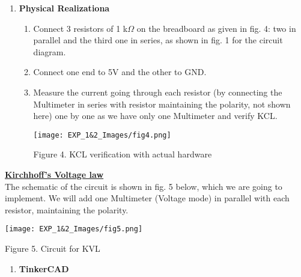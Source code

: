 \documentclass[12pt,a4paper]{article}
\begin{document}
\begin{justify}
\begin{enumerate}
\begin{center} 
\texttt{[image: EXP\_1\&2\_Images/fig3.png]}
\end{center}
\vspace{-10mm}
\begin{center} {Figure 3. KCL verification on TinkerCAD}\end{center}


\item{\textbf{Physical Realizationa}}

    \begin{enumerate}
    \item Connect 3 resistors of 1 k$\Omega$ on the breadboard as given in fig. 4: two in parallel and the third one in series, as shown in fig. 1 for the circuit diagram.
    \item Connect one end to 5V and the other to GND.
    \item Measure the current going through each resistor (by connecting the Multimeter in series with resistor maintaining the polarity, not shown here) one by one as we have only one Multimeter and verify KCL.
    
    \begin{center} 
    \texttt{[image: EXP\_1\&2\_Images/fig4.png]}
    \end{center}
    \begin{center} {Figure 4. KCL verification with actual hardware}\end{center}
    \end{enumerate}
    
\end {enumerate}

\noindent \underline{\textbf{Kirchhoff's Voltage law }}\\[3pt]
The schematic of the circuit is shown in fig. 5 below, which we are going to implement. We will add one Multimeter (Voltage mode) in parallel with each resistor, maintaining the polarity.

    \begin{center} 
    \texttt{[image: EXP\_1\&2\_Images/fig5.png]}
    \end{center}
    \vspace{-5mm}
    \begin{center} {Figure 5. Circuit for KVL}\end{center}

\begin{enumerate}
\item \textbf{TinkerCAD}
    

\end{enumerate}
\end{justify}
\end{document}
